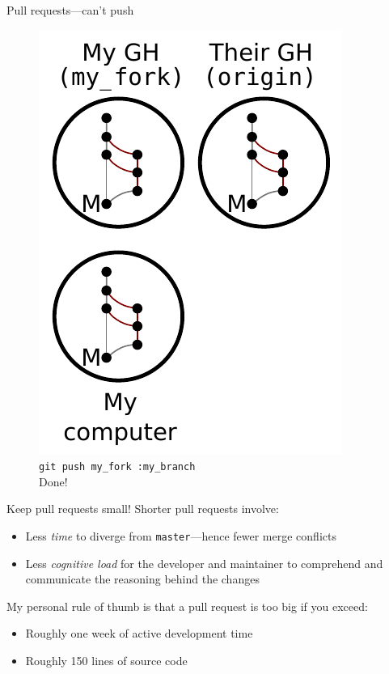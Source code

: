 \begin{frame}{Pull requests---can't push}
  \begin{figure}
    \includegraphics{fork_018.pdf}
    \\ \texttt{git push my\_fork :my\_branch}
    \\ Done!
  \end{figure}
\end{frame}

\begin{frame}{Keep pull requests small!}
  Shorter pull requests involve:

  \begin{itemize}
    \item Less \emph{time} to diverge from \texttt{master}---hence
          fewer merge conflicts
    \item Less \emph{cognitive load} for the developer and maintainer
          to comprehend and communicate the reasoning behind the
          changes
  \end{itemize}

  My personal rule of thumb is that a pull request is too big if you exceed:

  \begin{itemize}
    \item Roughly one week of active development time
    \item Roughly 150 lines of source code
  \end{itemize}
\end{frame}

